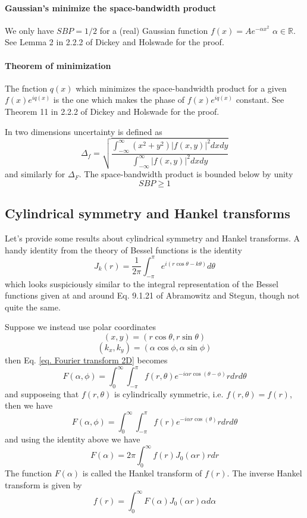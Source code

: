 \documentclass[../../main.tex]{subfiles} %
\begin{document}
\paragraph{Gaussian's minimize the space-bandwidth product} 
We only have $SBP=1/2$ for a (real) Gaussian function $f(x)=Ae^{-\alpha x^2}$ $\alpha \in \mathbb{R}$. See Lemma 2 in 2.2.2 of Dickey and Holswade for the proof.

\paragraph{Theorem of minimization} 
The fnction $q(x)$ which minimizes the space-bandwidth product for a given $f(x)e^{iq(x)}$ is the one which makes the phase of $f(x)e^{iq(x)}$ constant. See Theorem 11 in 2.2.2 of Dickey and Holswade for the proof.

In two dimensions uncertainty is defined as 
\begin{equation}
    \Delta_f=\sqrt{\frac{\int_{-\infty}^\infty (x^2+y^2)|f(x,y)|^2dxdy}{\int_{-\infty}^\infty |f(x,y)|^2dxdy}}
\end{equation}
and similarly for $\Delta_F$. The space-bandwidth product is bounded below by unity
\begin{equation}
    SBP\geq 1
\end{equation}

\subsection{Cylindrical symmetry and Hankel transforms}
Let's provide some results about cylindrical symmetry and Hankel transforms. A handy identity from the theory of Bessel functions is the identity 
\begin{equation}
    J_k(r)=\frac{1}{2\pi}\int_{-\pi}^\pi e^{i(r\cos\theta-k\theta)}d\theta
\end{equation}
which looks suspiciously similar to the integral representation of the Bessel functions given at and around Eq. 9.1.21 of Abramowitz and Stegun, though not quite the same. 

Suppose we instead use polar coordinates $$(x,y)=(r\cos\theta,r\sin\theta)$$ $$(k_x,k_y)=(\alpha\cos\phi,\alpha\sin\phi)$$
then Eq. \ref{eq. Fourier transform 2D} becomes
\begin{equation}
    F(\alpha,\phi)=\int_0^\infty\int_{-\pi}^{\pi}f(r,\theta)e^{-i\alpha r\cos(\theta-\phi)}rdrd\theta
\end{equation}
and supposeing that $f(r,\theta)$ is cylindrically symmetric, i.e. $f(r,\theta)=f(r)$, then we have
\begin{equation}
    F(\alpha,\phi)=\int_0^\infty\int_{-\pi}^{\pi}f(r)e^{-i\alpha r\cos(\theta)}rdrd\theta
\end{equation}
and using the identity above we have
\begin{equation}
    F(\alpha)=2\pi\int_0^\infty f(r)J_0(\alpha r)rdr
\end{equation}
The function $F(\alpha)$ is called the Hankel transform of $f(r)$. The inverse Hankel transform is given by
\begin{equation}
    f(r)=\int_0^\infty F(\alpha)J_0(\alpha r)\alpha d\alpha
\end{equation}
\end{document}
